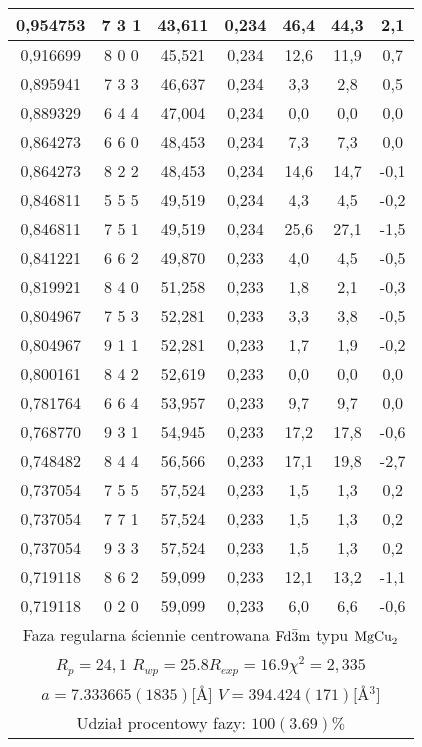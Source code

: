 \documentclass[a4paper,12pt]{article}
\numberwithin{equation}{section}
\newcommand{\nit}[1]{\textnormal{#1}}
\begin{document}
\begin{appendices}
\begin{longtable}[c]{|c|c|c|c|c|c|c|}
0,954753	&	7   3   1	&	43,611	&	0,234	&	46,4	&	44,3	&	2,1	\\\hline
0,916699	&	8   0   0	&	45,521	&	0,234	&	12,6	&	11,9	&	0,7	\\\hline
0,895941	&	7   3   3	&	46,637	&	0,234	&	3,3	&	2,8	&	0,5	\\\hline
0,889329	&	6   4   4	&	47,004	&	0,234	&	0,0	&	0,0	&	0,0	\\\hline
0,864273	&	6   6   0	&	48,453	&	0,234	&	7,3	&	7,3	&	0,0	\\\hline
0,864273	&	8   2   2	&	48,453	&	0,234	&	14,6	&	14,7	&	-0,1	\\\hline
0,846811	&	5   5   5	&	49,519	&	0,234	&	4,3	&	4,5	&	-0,2	\\\hline
0,846811	&	7   5   1	&	49,519	&	0,234	&	25,6	&	27,1	&	-1,5	\\\hline
0,841221	&	6   6   2	&	49,870	&	0,233	&	4,0	&	4,5	&	-0,5	\\\hline
0,819921	&	8   4   0	&	51,258	&	0,233	&	1,8	&	2,1	&	-0,3	\\\hline
0,804967	&	7   5   3	&	52,281	&	0,233	&	3,3	&	3,8	&	-0,5	\\\hline
0,804967	&	9   1   1	&	52,281	&	0,233	&	1,7	&	1,9	&	-0,2	\\\hline
0,800161	&	8   4   2	&	52,619	&	0,233	&	0,0	&	0,0	&	0,0	\\\hline
0,781764	&	6   6   4	&	53,957	&	0,233	&	9,7	&	9,7	&	0,0	\\\hline
0,768770	&	9   3   1	&	54,945	&	0,233	&	17,2	&	17,8	&	-0,6	\\\hline
0,748482	&	8   4   4	&	56,566	&	0,233	&	17,1	&	19,8	&	-2,7	\\\hline
0,737054	&	7   5   5	&	57,524	&	0,233	&	1,5	&	1,3	&	0,2	\\\hline
0,737054	&	7   7   1	&	57,524	&	0,233	&	1,5	&	1,3	&	0,2	\\\hline
0,737054	&	9   3   3	&	57,524	&	0,233	&	1,5	&	1,3	&	0,2	\\\hline
0,719118	&	8   6   2	&	59,099	&	0,233	&	12,1	&	13,2	&	-1,1	\\\hline
0,719118	&	0   2   0	&	59,099	&	0,233	&	6,0	&	6,6	&	-0,6	\\\hline

    \multicolumn{7}{|c|}{ Faza regularna ściennie centrowana $\nit{Fd}\bar{3}\nit{m}$ typu $\nit{MgCu}_2$ }\\
    \multicolumn{7}{|c|}{ $R_p=24,1$ \hspace{0.4cm}$R_{wp}=25.8$\hspace{0.4cm}$R_{exp}=16.9$\hspace{0.4cm}$\chi^2=2,335$  }\\
    \multicolumn{7}{|c|}{ $a=7.333665(1835) [$\AA$]$ \hspace{0.4cm}$V=394.424(171) [$\AA$^3]$ }\\
    \multicolumn{7}{|c|}{ Udział procentowy fazy: $100(3.69)\%$ }\\\hline


\end{longtable}
\end{appendices}
\end{document}

